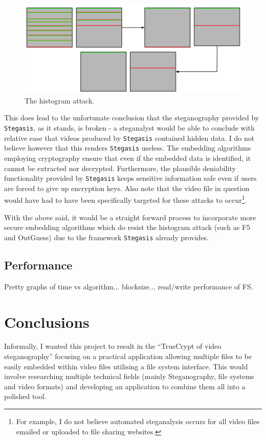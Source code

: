 \documentclass[paper=a4, fontsize=11pt,twoside]{scrartcl}    %
\numberwithin{table}{section}
\numberwithin{figure}{section}
\numberwithin{algorithm}{section}
\begin{document}
\begin{figure}[!h]
\centerline{\includegraphics[width=\textwidth]{images/compact.png}}
\caption{The histogram attack.}
\label{hist}
\end{figure}

This does lead to the unfortunate conclusion that the steganography provided by \texttt{Stegasis}, as it stands, is broken - a steganalyst would be able to conclude with relative ease that videos produced by \texttt{Stegasis} contained hidden data. I do not believe however that this renders \texttt{Stegasis} useless. The embedding algorithms employing cryptography ensure that even if the embedded data is identified, it cannot be extracted nor decrypted. Furthermore, the plausible deniability functionality provided by \texttt{Stegasis} keeps sensitive information safe even if users are forced to give up encryption keys. Also note that the video file in question would have had to have been specifically targeted for these attacks to occur\footnote{For example, I do not believe automated steganalysis occurs for all video files emailed or uploaded to file sharing websites.}.

With the above said, it would be a straight forward process to incorporate more secure embedding algorithms which do resist the histogram attack (such as F5 and OutGuess) due to the framework \texttt{Stegasis} already provides.

\subsection{Performance}
\label{perf}

Pretty graphs of time vs algorithm... blocksize... read/write performance of FS.

\section{Conclusions}

Informally, I wanted this project to result in the ``TrueCrypt of video steganography'' focusing on a practical application allowing multiple files to be easily embedded within video files utilising a file system interface. This would involve researching multiple technical fields (mainly Steganography, file systems and video formats) and developing an application to combine them all into a polished tool.
\end{document}
